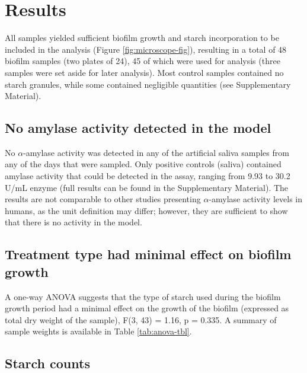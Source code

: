 \documentclass[utf8]{../templates/frontiersSCNS}
\begin{document}
\hypertarget{results}{%
\section{Results}\label{results}}

All samples yielded sufficient biofilm growth and starch incorporation to be
included in the analysis (Figure \ref{fig:microscope-fig}), resulting in a total of 48 biofilm samples (two plates of 24),
45 of which were used for analysis (three samples were set aside for later
analysis).
Most control samples contained no starch granules, while some contained negligible
quantities (see Supplementary Material).

\hypertarget{no-amylase-activity-detected-in-the-model}{%
\subsection{No amylase activity detected in the model}\label{no-amylase-activity-detected-in-the-model}}

No \(\alpha\)-amylase activity was detected in any of the artificial
saliva samples from any of the days that were sampled. Only positive controls
(saliva)
contained amylase activity that could be detected in the assay, ranging from
9.93 to 30.2 U/mL enzyme
(full results can be found in the Supplementary Material).
The results are not comparable to other studies presenting \(\alpha\)-amylase activity
levels in humans, as the unit definition may differ;
however, they are sufficient to show that there is no activity in the model.

\hypertarget{treatment-type-had-minimal-effect-on-biofilm-growth}{%
\subsection{Treatment type had minimal effect on biofilm growth}\label{treatment-type-had-minimal-effect-on-biofilm-growth}}

A one-way ANOVA suggests that the type of starch used during the biofilm
growth period had a minimal effect on the growth of the biofilm
(expressed as total dry weight of the sample), F(3, 43)
= 1.16, p = 0.335.
A summary of sample weights is available in Table \ref{tab:anova-tbl}.

\hypertarget{starch-counts}{%
\subsection{Starch counts}\label{starch-counts}}
\end{document}

